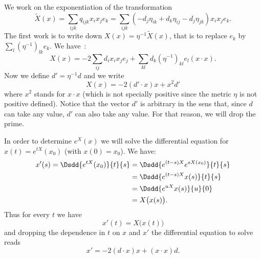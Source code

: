 \begin{description}
		We work on the exponentiation of the transformation
		\begin{equation}
			\tilde X(x)=\sum_{ijk}q_{ijk}x_ix_je_k=\sum_{ijk}(-d_j\eta_{ik}+d_k\eta_{ij}-d_j\eta_{jk})x_ix_je_k.
		\end{equation}
		The first work is to write down \( X(x)=\eta^{-1}\tilde X(x)\), that is to replace \( e_k\) by \( \sum_l(\eta^{-1})_{lk}e_k\). We have~:
		\begin{equation}
			X(x)=-2\sum_{ij}d_ix_ix_je_j+\sum_{kl}d_k(\eta^{-1})_{kl}e_l(x\cdot x).
		\end{equation}
		Now we define \( d'=\eta^{-1}d\) and we write
		\begin{equation}
			X(x)=-2(d'\cdot x)x+x^2d'
		\end{equation}
		where \( x^2\) stands for \( x\cdot x\) (which is not specially positive since the metric \( \eta\) is not positive defined). Notice that the vector \( d'\) is arbitrary in the sens that, since \( d\) can take any value, \( d'\) can also take any value. For that reason, we will drop the prime.

		In order to determine \(  e^{X}(x)\) we will solve the differential equation for \( x(t)= e^{tX}(x_0)\) (with \( x(0)=x_0\)). We have:
		\begin{subequations}
			\begin{align}
				x'(s)=\Dsdd{  e^{tX}(x_0) }{t}{s} & =\Dsdd{  e^{(t-s)X}   e^{sX(x_0)}  }{t}{s} \\
				                                  & =\Dsdd{  e^{(t-s)X}x(s) }{t}{s}            \\
				                                  & =\Dsdd{  e^{uX}x(s) }{u}{0}                \\
				                                  & =X\big( x(s) \big).
			\end{align}
		\end{subequations}
		Thus for every \( t\) we have
		\begin{equation}
			x'(t)=X\big( x(t) \big)
		\end{equation}
		and dropping the dependence in \( t\) on \( x\) and \( x'\) the differential equation to solve reads\cite{ooUCSPooYwxHzL}
		\begin{equation}
			x'=-2(d\cdot x)x+(x\cdot x)d.
		\end{equation}


\end{description}
